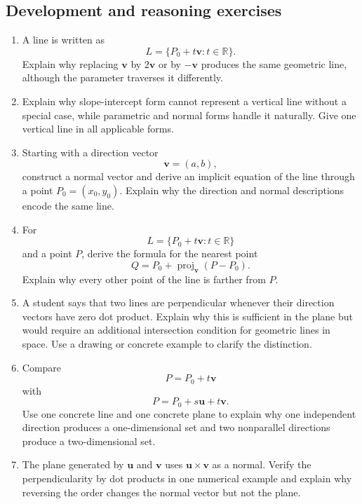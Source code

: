 \subsection{Development and reasoning exercises}

\begin{enumerate}

\item A line is written as
\[
L=\{P_0+t\mathbf v:t\in\mathbb R\}.
\]
Explain why replacing $\mathbf v$ by $2\mathbf v$ or by $-\mathbf v$ produces
the same geometric line, although the parameter traverses it differently.

\item Explain why slope-intercept form cannot represent a vertical line without
a special case, while parametric and normal forms handle it naturally. Give one
vertical line in all applicable forms.

\item Starting with a direction vector
\[
\mathbf v=(a,b),
\]
construct a normal vector and derive an implicit equation of the line through a
point $P_0=(x_0,y_0)$. Explain why the direction and normal descriptions encode
the same line.

\item For
\[
L=\{P_0+t\mathbf v:t\in\mathbb R\}
\]
and a point $P$, derive the formula for the nearest point
\[
Q=P_0+\operatorname{proj}_{\mathbf v}(P-P_0).
\]
Explain why every other point of the line is farther from $P$.

\item A student says that two lines are perpendicular whenever their direction
vectors have zero dot product. Explain why this is sufficient in the plane but
would require an additional intersection condition for geometric lines in
space. Use a drawing or concrete example to clarify the distinction.

\item Compare
\[
P=P_0+t\mathbf v
\]
with
\[
P=P_0+s\mathbf u+t\mathbf v.
\]
Use one concrete line and one concrete plane to explain why one independent
direction produces a one-dimensional set and two nonparallel directions
produce a two-dimensional set.

\item The plane generated by $\mathbf u$ and $\mathbf v$ uses
$\mathbf u\times\mathbf v$ as a normal. Verify the perpendicularity by dot
products in one numerical example and explain why reversing the order changes
the normal vector but not the plane.


\end{enumerate}
